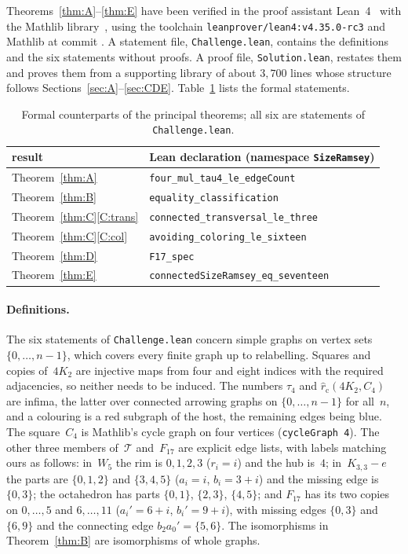 \documentclass[11pt,letterpaper]{article}
\numberwithin{equation}{section}
\theoremstyle{plain}
\theoremstyle{definition}
\theoremstyle{remark}
\newcommand{\Kme}{K_{3,3}-e}
\newcommand{\rc}{\hat r_{\mathrm{c}}}
\newcommand{\Tfam}{\mathcal{T}}
\begin{document}
Theorems~\ref{thm:A}--\ref{thm:E} have been verified in the proof assistant Lean~4~\cite{Lean4} with the Mathlib library~\cite{Mathlib20}, using the toolchain \texttt{leanprover/lean4:v4.35.0-rc3} and Mathlib at commit \texttt{}. A statement file, \texttt{Challenge.lean}, contains the definitions and the six statements without proofs. A proof file, \texttt{Solution.lean}, restates them and proves them from a supporting library of about $3{,}700$ lines whose structure follows Sections~\ref{sec:A}--\ref{sec:CDE}. Table~\ref{tab:lean} lists the formal statements.

\begin{table}[ht]
\centering
\begin{tabular}{@{}ll@{}}
\toprule
result & Lean declaration (namespace \texttt{SizeRamsey}) \\
\midrule
Theorem~\ref{thm:A} & \texttt{four\_mul\_tau4\_le\_edgeCount} \\
Theorem~\ref{thm:B} & \texttt{equality\_classification} \\
Theorem~\ref{thm:C}\ref{C:trans} & \texttt{connected\_transversal\_le\_three} \\
Theorem~\ref{thm:C}\ref{C:col} & \texttt{avoiding\_coloring\_le\_sixteen} \\
Theorem~\ref{thm:D} & \texttt{F17\_spec} \\
Theorem~\ref{thm:E} & \texttt{connectedSizeRamsey\_eq\_seventeen} \\
\bottomrule
\end{tabular}
\caption{Formal counterparts of the principal theorems; all six are statements of \texttt{Challenge.lean}.}
\label{tab:lean}
\end{table}

\paragraph{Definitions.} The six statements of \texttt{Challenge.lean} concern simple graphs on vertex sets $\{0,\dots,n-1\}$, which covers every finite graph up to relabelling. Squares and copies of~$4K_2$ are injective maps from four and eight indices with the required adjacencies, so neither needs to be induced. The numbers $\tau_4$ and $\rc(4K_2,C_4)$ are infima, the latter over connected arrowing graphs on $\{0,\dots,n-1\}$ for all~$n$, and a colouring is a red subgraph of the host, the remaining edges being blue. The square~$C_4$ is Mathlib's cycle graph on four vertices (\texttt{cycleGraph~4}). The other three members of~$\Tfam$ and~$F_{17}$ are explicit edge lists, with labels matching ours as follows: in~$W_5$ the rim is $0,1,2,3$ ($r_i=i$) and the hub is~$4$; in~$\Kme$ the parts are $\{0,1,2\}$ and $\{3,4,5\}$ ($a_i=i$, $b_i=3+i$) and the missing edge is $\{0,3\}$; the octahedron has parts $\{0,1\}$, $\{2,3\}$, $\{4,5\}$; and $F_{17}$ has its two copies on $0,\dots,5$ and $6,\dots,11$ ($a_i'=6+i$, $b_i'=9+i$), with missing edges $\{0,3\}$ and $\{6,9\}$ and the connecting edge $b_2a_0'=\{5,6\}$. The isomorphisms in Theorem~\ref{thm:B} are isomorphisms of whole graphs.
\end{document}

